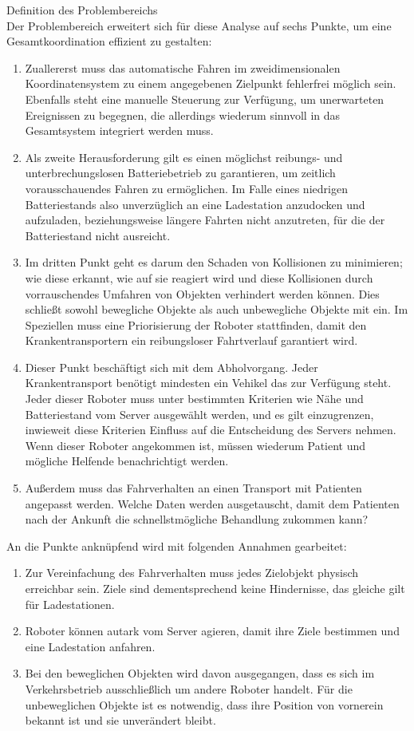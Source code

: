 Definition des Problembereichs\\
Der Problembereich erweitert sich für diese Analyse auf sechs Punkte, um eine Gesamtkoordination effizient zu gestalten:\\

\begin{enumerate}
	\item Zuallererst muss das automatische Fahren im zweidimensionalen Koordinatensystem zu einem angegebenen Zielpunkt fehlerfrei möglich sein. Ebenfalls steht eine manuelle Steuerung zur Verfügung, um unerwarteten Ereignissen zu begegnen, die allerdings wiederum sinnvoll in das Gesamtsystem integriert werden muss.
	\item Als zweite Herausforderung gilt es einen möglichst reibungs- und unterbrechungslosen Batteriebetrieb zu garantieren, um zeitlich vorausschauendes Fahren zu ermöglichen. Im Falle eines niedrigen Batteriestands also unverzüglich an eine Ladestation anzudocken und aufzuladen, beziehungsweise längere Fahrten nicht anzutreten, für die der Batteriestand nicht ausreicht.
	\item Im dritten Punkt geht es darum den Schaden von Kollisionen zu minimieren; wie diese erkannt, wie auf sie reagiert wird und diese Kollisionen durch vorrauschendes Umfahren von Objekten verhindert werden können. Dies schließt sowohl bewegliche Objekte als auch unbewegliche Objekte mit ein. Im Speziellen muss eine Priorisierung der Roboter stattfinden, damit den Krankentransportern ein reibungsloser Fahrtverlauf garantiert wird.
	\item Dieser Punkt beschäftigt sich mit dem Abholvorgang. Jeder Krankentransport benötigt mindesten ein Vehikel das zur Verfügung steht. Jeder dieser Roboter muss unter bestimmten Kriterien wie Nähe und Batteriestand vom Server ausgewählt werden, und es gilt einzugrenzen, inwieweit diese Kriterien Einfluss auf die Entscheidung des Servers nehmen. Wenn dieser Roboter angekommen ist, müssen wiederum Patient und mögliche Helfende benachrichtigt werden.
	\item Außerdem muss das Fahrverhalten an einen Transport mit Patienten angepasst werden. Welche Daten werden ausgetauscht, damit dem Patienten nach der Ankunft die schnellstmögliche Behandlung zukommen kann?
\end{enumerate}

An die Punkte anknüpfend wird mit folgenden Annahmen gearbeitet:\\
\begin{enumerate}
	\item Zur Vereinfachung des Fahrverhalten muss jedes Zielobjekt physisch erreichbar sein. Ziele sind dementsprechend keine Hindernisse, das gleiche gilt für Ladestationen.
	\item Roboter können autark vom Server agieren, damit ihre Ziele bestimmen und eine Ladestation anfahren.
	\item Bei den beweglichen Objekten wird davon ausgegangen, dass es sich im Verkehrsbetrieb ausschließlich um andere Roboter handelt. Für die unbeweglichen Objekte ist es notwendig, dass ihre Position von vornerein bekannt ist und sie unverändert bleibt.
\end{enumerate}
